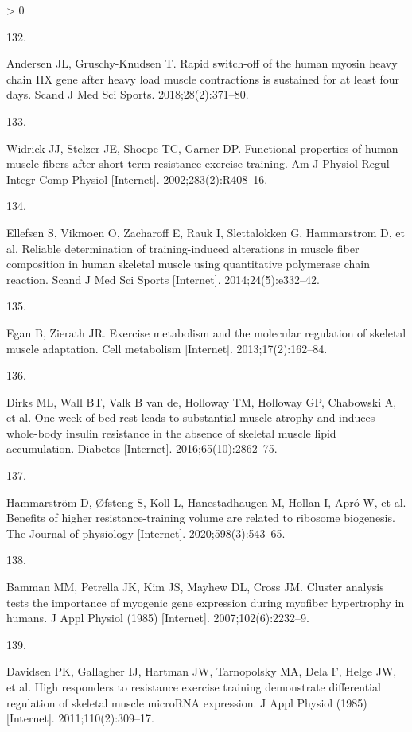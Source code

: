 \documentclass[twoside,10pt]{gihclass} %
\newlength{\cslhangindent}
\newlength{\csllabelwidth}
\newenvironment{CSLReferences}[3] %
 {%
  \setlength{\parindent}{0pt}
  \ifodd #1 \everypar{\setlength{\hangindent}{\cslhangindent}}\ignorespaces\fi
  \ifnum #2 > 0
  \setlength{\parskip}{#2\baselineskip}
  \fi
 }%
 {}
\newcommand{\CSLLeftMargin}[1]{\parbox[t]{\maxof{\widthof{#1}}{\csllabelwidth}}{#1}}
\newcommand{\CSLRightInline}[1]{\parbox[t]{\linewidth}{#1}}
\begin{document}
\begin{CSLReferences}{0}{0}
\leavevmode\hypertarget{ref-RN2056}{}%
\CSLLeftMargin{132. }
\CSLRightInline{Andersen JL, Gruschy-Knudsen T. Rapid switch-off of the human myosin heavy chain IIX gene after heavy load muscle contractions is sustained for at least four days. Scand J Med Sci Sports. 2018;28(2):371--80. }

\leavevmode\hypertarget{ref-RN2169}{}%
\CSLLeftMargin{133. }
\CSLRightInline{Widrick JJ, Stelzer JE, Shoepe TC, Garner DP. Functional properties of human muscle fibers after short-term resistance exercise training. Am J Physiol Regul Integr Comp Physiol {[}Internet{]}. 2002;283(2):R408--16. }

\leavevmode\hypertarget{ref-RN1489}{}%
\CSLLeftMargin{134. }
\CSLRightInline{Ellefsen S, Vikmoen O, Zacharoff E, Rauk I, Slettalokken G, Hammarstrom D, et al. Reliable determination of training-induced alterations in muscle fiber composition in human skeletal muscle using quantitative polymerase chain reaction. Scand J Med Sci Sports {[}Internet{]}. 2014;24(5):e332--42. }

\leavevmode\hypertarget{ref-RN2364}{}%
\CSLLeftMargin{135. }
\CSLRightInline{Egan B, Zierath JR. Exercise metabolism and the molecular regulation of skeletal muscle adaptation. Cell metabolism {[}Internet{]}. 2013;17(2):162--84. }

\leavevmode\hypertarget{ref-RN2365}{}%
\CSLLeftMargin{136. }
\CSLRightInline{Dirks ML, Wall BT, Valk B van de, Holloway TM, Holloway GP, Chabowski A, et al. One week of bed rest leads to substantial muscle atrophy and induces whole-body insulin resistance in the absence of skeletal muscle lipid accumulation. Diabetes {[}Internet{]}. 2016;65(10):2862--75. }

\leavevmode\hypertarget{ref-RN2358}{}%
\CSLLeftMargin{137. }
\CSLRightInline{Hammarström D, Øfsteng S, Koll L, Hanestadhaugen M, Hollan I, Apró W, et al. Benefits of higher resistance-training volume are related to ribosome biogenesis. The Journal of physiology {[}Internet{]}. 2020;598(3):543--65. }

\leavevmode\hypertarget{ref-RN765}{}%
\CSLLeftMargin{138. }
\CSLRightInline{Bamman MM, Petrella JK, Kim JS, Mayhew DL, Cross JM. Cluster analysis tests the importance of myogenic gene expression during myofiber hypertrophy in humans. J Appl Physiol (1985) {[}Internet{]}. 2007;102(6):2232--9. }

\leavevmode\hypertarget{ref-RN755}{}%
\CSLLeftMargin{139. }
\CSLRightInline{Davidsen PK, Gallagher IJ, Hartman JW, Tarnopolsky MA, Dela F, Helge JW, et al. High responders to resistance exercise training demonstrate differential regulation of skeletal muscle microRNA expression. J Appl Physiol (1985) {[}Internet{]}. 2011;110(2):309--17. }


\end{CSLReferences}
\end{document}
